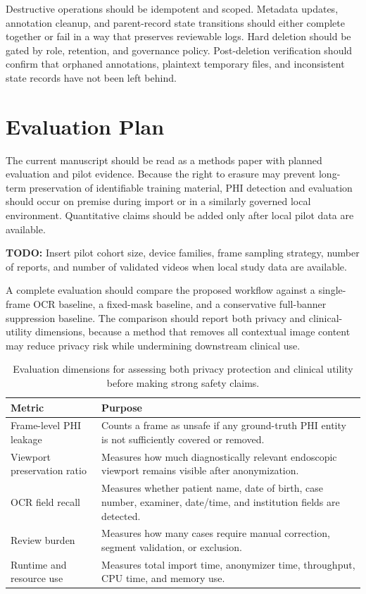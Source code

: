 \documentclass{article}
\begin{document}
Destructive operations should be idempotent and scoped. Metadata updates,
annotation cleanup, and parent-record state transitions should either complete
together or fail in a way that preserves reviewable logs. Hard deletion should
be gated by role, retention, and governance policy. Post-deletion verification
should confirm that orphaned annotations, plaintext temporary files, and
inconsistent state records have not been left behind.

\section{Evaluation Plan}
The current manuscript should be read as a methods paper with planned
evaluation and pilot evidence. Because the right to erasure may prevent
long-term preservation of identifiable training material, PHI detection and
evaluation should occur on premise during import or in a similarly governed
local environment. Quantitative claims should be added only after local pilot
data are available.

\noindent\textbf{TODO:} Insert pilot cohort size, device families, frame
sampling strategy, number of reports, and number of validated videos when local
study data are available.

A complete evaluation should compare the proposed workflow against a
single-frame OCR baseline, a fixed-mask baseline, and a conservative
full-banner suppression baseline. The comparison should report both privacy
and clinical-utility dimensions, because a method that removes all contextual
image content may reduce privacy risk while undermining downstream clinical
use.

\begin{table}[htbp]
\centering
\begin{tabular}{p{}p{}}
\toprule
\textbf{Metric} & \textbf{Purpose} \\
\midrule
Frame-level PHI leakage & Counts a frame as unsafe if any ground-truth PHI
entity is not sufficiently covered or removed. \\
Viewport preservation ratio & Measures how much diagnostically relevant
endoscopic viewport remains visible after anonymization. \\
OCR field recall & Measures whether patient name, date of birth, case number,
examiner, date/time, and institution fields are detected. \\
Review burden & Measures how many cases require manual correction, segment
validation, or exclusion. \\
Runtime and resource use & Measures total import time, anonymizer time,
throughput, CPU time, and memory use. \\
\bottomrule
\end{tabular}
\caption{Evaluation dimensions for assessing both privacy protection and
clinical utility before making strong safety claims.}
\label{tab:evaluation}
\end{table}
\end{document}
